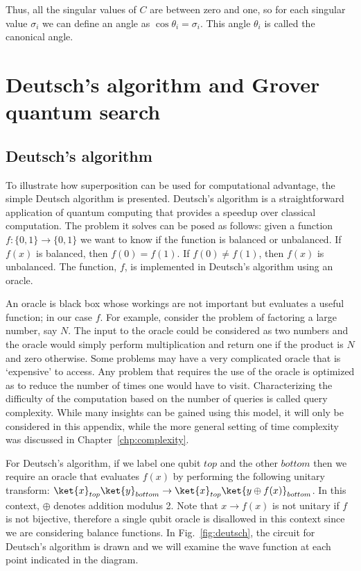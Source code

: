 \documentclass[11pt,oneside,final]{huthesis}%
\begin{document}
Thus, all the singular values of $C$ are between zero and one, so for each singular value $\sigma_i$ we can define an angle as $\cos \theta_i =\sigma_i$.  This angle $\theta_i$ is called the canonical angle.

\chapter{Deutsch's algorithm and Grover quantum search}\label{appx:qalgs}
\section{Deutsch's algorithm}\label{sec:deu}
To illustrate how superposition can be used for computational advantage, the simple Deutsch algorithm \cite{Deutsch85} is presented. 
Deutsch's algorithm is a straightforward application of quantum computing that provides a speedup over classical computation.  The problem it solves can be posed as follows: given a function $f:\{0,1\}\rightarrow\{0,1\}$ we want to know if the function is balanced or unbalanced.  If $f(x)$ is balanced, then $f(0)=f(1).$ If $f(0)\neq f(1)$, then $f(x)$ is unbalanced.  The function, $f$, is implemented in Deutsch's algorithm using an oracle.

An oracle is black box whose workings are not important but evaluates a useful function; in our case $f$. %
For example, consider the problem of factoring a large number, say $N$. The input to the oracle could be considered as two numbers and the oracle would simply perform multiplication and return one if the product is $N$ and zero otherwise.  Some problems may have a very complicated oracle that is `expensive' to access. Any problem that requires the use of the oracle is optimized as to reduce the number of times one would have to visit.  Characterizing the difficulty of the computation based on the number of queries is called query complexity.  While many insights can be gained using this model, it will only be considered in this appendix, while the more general setting of time complexity was discussed in Chapter~\ref{chp:complexity}.


For Deutsch's algorithm, if we label one qubit $top$ and the other $bottom$ then we require an oracle that evaluates $f(x)$ by performing the following unitary transform: $\ket{x}_{top}\ket{y}_{bottom}\rightarrow\ket{x}_{top}\ket{y\oplus f(x)}_{bottom}$.  In this context, $\oplus$ denotes addition modulus 2.  Note that $x\rightarrow f(x)$ is not unitary if $f$ is not bijective, therefore a single qubit oracle is disallowed in this context since we are considering balance functions. In Fig.~\ref{fig:deutsch}, the circuit for Deutsch's algorithm is drawn and we will examine the wave function at each point indicated in the diagram.  
\end{document}
